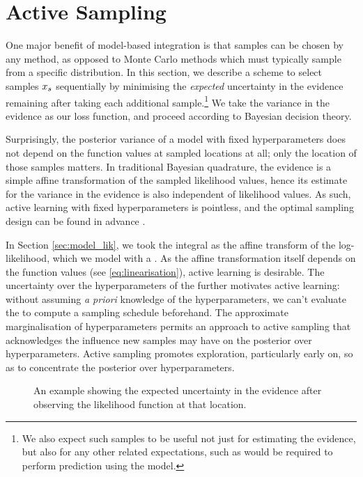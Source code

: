 \documentclass{article}
\begin{document}
\section{Active Sampling}\label{sec:BBQ}

One major benefit of model-based integration is that samples can be chosen by any method, as opposed to Monte Carlo methods which must typically sample from a specific distribution.  In this section, we describe a scheme to select samples $\lfv_s$ sequentially by minimising the \textit{expected} uncertainty in the evidence remaining after taking each additional sample.\footnote{We also expect such samples to be useful not just for estimating the evidence, but also for any other related expectations, such as would be required to perform prediction using the model.} We take the variance in the evidence as our loss function, and proceed according to Bayesian decision theory.

Surprisingly, the posterior variance of a \gpb model with fixed hyperparameters does not depend on the function values at sampled locations at all; only the location of those samples matters. In traditional Bayesian quadrature, the evidence is a simple affine transformation of the sampled likelihood values, hence its estimate for the variance in the evidence is also independent of likelihood values. As such, active learning with fixed hyperparameters is pointless, and the optimal sampling design can be found in advance \cite{minka2000dqr}.

In Section \ref{sec:model_lik}, we took the integral as the affine transform of the log-likelihood, which we model with a \gp. As the affine transformation itself depends on the function values (see \eqref{eq:linearisation}), active learning is  desirable. The uncertainty over the hyperparameters of the \gpb further motivates active learning: without assuming \textit{a priori} knowledge of the hyperparameters, we can't evaluate the \gpb to compute a sampling schedule beforehand. The approximate marginalisation of hyperparameters permits an approach to active sampling that acknowledges the influence new samples may have on the posterior over hyperparameters. Active sampling promotes exploration, particularly early on, so as to concentrate the posterior over hyperparameters. 

 \begin{figure}
 \centering
{}
 \caption{An example showing the expected uncertainty in the evidence after observing the likelihood function at that location.}
 \label{fig:eue}
 \end{figure}
 
\end{document}
